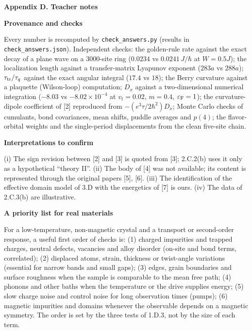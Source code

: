 \documentclass[11pt,a4paper]{article}
\newcommand{\eF}{\varepsilon_{\rm F}}
\newcommand{\pagetitle}[1]{{\large\bfseries\color{ink}#1}\par\vspace{4pt}}
\newcommand{\smallheading}[1]{\par\Needspace{6\baselineskip}\medskip\textbf{#1}\par}
\begin{document}
\pagetitle{Appendix D. Teacher notes}
\smallheading{Provenance and checks}
Every number is recomputed by \texttt{check\_answers.py} (results in \texttt{check\_answers.json}). Independent checks: the golden-rule rate against the exact decay of a plane wave on a 3000-site ring ($0.0234$ vs $0.0241\,J/\hbar$ at $W=0.5J$); the localization length against a transfer-matrix Lyapunov exponent ($283a$ vs $288a$); $\tau_{\rm tr}/\tau_q$ against the exact angular integral ($17.4$ vs $18$); the Berry curvature against a plaquette (Wilson-loop) computation; $D_x$ against a two-dimensional numerical integration ($-8.03$ vs $-8.02\times10^{-4}$ at $v_t=0.02$, $m=0.4$, $\eF=1$); the curvature-dipole coefficient of [2] reproduced from $-(e^3\tau/2\hbar^2)D_x$; Monte Carlo checks of cumulants, bond covariances, mean shifts, puddle averages and $p(4)$; the flavor-orbital weights and the single-period displacements from the clean five-site chain.

\smallheading{Interpretations to confirm}
(i) The sign revision between [2] and [3] is quoted from [3]; 2.C.2(b) uses it only as a hypothetical ``theory II''. (ii) The body of [4] was not available; its content is represented through the original papers [5], [6]. (iii) The identification of the effective domain model of 3.D with the energetics of [7] is ours. (iv) The data of 2.C.3(b) are illustrative.

\smallheading{A priority list for real materials}
For a low-temperature, non-magnetic crystal and a transport or second-order response, a useful first order of checks is: (1) charged impurities and trapped charges, neutral defects, vacancies and alloy disorder (on-site and bond terms, correlated); (2) displaced atoms, strain, thickness or twist-angle variations (essential for narrow bands and small gaps); (3) edges, grain boundaries and surface roughness when the sample is comparable to the mean free path; (4) phonons and other baths when the temperature or the drive supplies energy; (5) slow charge noise and control noise for long observation times (pumps); (6) magnetic impurities and domains whenever the observable depends on a magnetic symmetry. The order is set by the three tests of 1.D.3, not by the size of each term.
\end{document}

